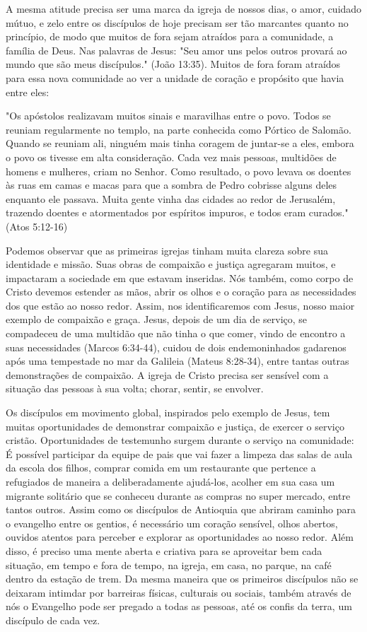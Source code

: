 \documentclass[12pt]{abntex2}
\begin{document}
A mesma atitude precisa ser uma marca da igreja de nossos dias, o amor, cuidado mútuo, e zelo entre os discípulos de hoje precisam ser tão marcantes quanto no princípio, de modo que muitos de fora sejam atraídos para a comunidade, a família de Deus. Nas palavras de Jesus: "Seu amor uns pelos outros provará ao mundo que são meus discípulos." (João 13:35). Muitos de fora foram atraídos para essa nova comunidade ao ver a unidade de coração e propósito que havia entre eles:

\begin{citacao}"Os apóstolos realizavam muitos sinais e maravilhas entre o povo. Todos se reuniam regularmente no templo, na parte conhecida como Pórtico de Salomão. Quando se reuniam ali, ninguém mais tinha coragem de juntar-se a eles, embora o povo os tivesse em alta consideração. Cada vez mais pessoas, multidões de homens e mulheres, criam no Senhor. Como resultado, o povo levava os doentes às ruas em camas e macas para que a sombra de Pedro cobrisse alguns deles enquanto ele passava. Muita gente vinha das cidades ao redor de Jerusalém, trazendo doentes e atormentados por espíritos impuros, e todos eram curados." (Atos 5:12-16)\end{citacao}

Podemos observar que as primeiras igrejas tinham muita clareza sobre sua identidade e missão. Suas obras de compaixão e justiça agregaram muitos, e impactaram a sociedade em que estavam inseridas. Nós também, como corpo de Cristo devemos estender as mãos, abrir os olhos e o coração para as necessidades dos que estão ao nosso redor. Assim, nos identificaremos com Jesus, nosso maior exemplo de compaixão e graça. Jesus, depois de um dia de serviço, se compadeceu de uma multidão que não tinha o que comer, vindo de encontro a suas necessidades (Marcos 6:34-44), cuidou de dois endemoninhados gadarenos após uma tempestade no mar da Galileia (Mateus 8:28-34), entre tantas outras demonstrações de compaixão. A igreja de Cristo precisa ser sensível com a situação das pessoas à sua volta; chorar, sentir, se envolver\cite[p. 172]{brandao}.

Os discípulos em movimento global, inspirados pelo exemplo de Jesus, tem muitas oportunidades de demonstrar compaixão e justiça, de exercer o serviço cristão. Oportunidades de testemunho surgem durante o serviço na comunidade: É possível participar da equipe de pais que vai fazer a limpeza das salas de aula da escola dos filhos, comprar comida em um restaurante que pertence a refugiados de maneira a deliberadamente ajudá-los, acolher em sua casa um migrante solitário que se conheceu durante as compras no super mercado, entre tantos outros. Assim como os discípulos de Antioquia que abriram caminho para o evangelho entre os gentios, é necessário um coração sensível, olhos abertos, ouvidos atentos para perceber e explorar as oportunidades ao nosso redor. Além disso, é preciso uma mente aberta e criativa para se aproveitar bem cada situação, em tempo e fora de tempo, na igreja, em casa, no parque, na café dentro da estação de trem. Da mesma maneira que os primeiros discípulos não se deixaram intimdar por barreiras físicas, culturais ou sociais, também através de nós o Evangelho pode ser pregado a todas as pessoas, até os confis da terra, um discípulo de cada vez.
\end{document}
